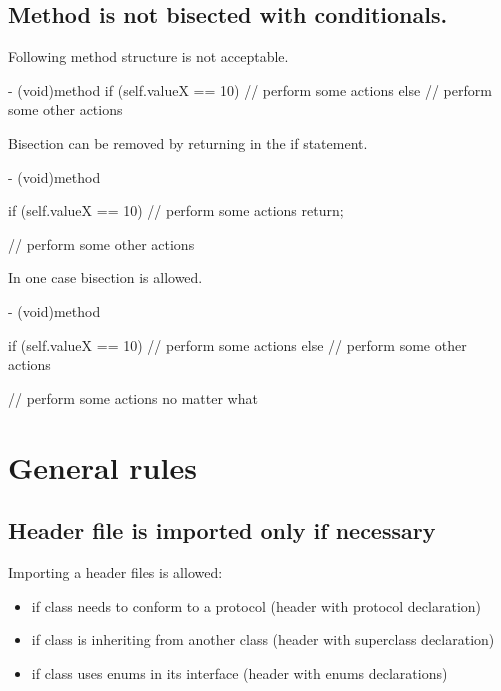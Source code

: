 \documentclass[10pt]{extarticle}
\newenvironment{codelisting}
{\footnotesize\mdframed[middlelinewidth=0.5pt, middlelinecolor=BaliHaiColor, skipabove=15pt]\verbatim}
{\endverbatim\endmdframed\vspace{12pt}\normalsize}
\begin{document}
\subsection{Method is not bisected with conditionals.}

Following method structure is not acceptable.

\begin{codelisting}
- (void)method
{
    if (self.valueX == 10) {
        // perform some actions
    }
    else {
        // perform some other actions
    }
}
\end{codelisting}

Bisection can be removed by returning in the if statement.

\begin{codelisting}
- (void)method
{
    if (self.valueX == 10) {
        // perform some actions
        return;
    }
    
    // perform some other actions
}
\end{codelisting}

In one case bisection is allowed.

\begin{codelisting}
- (void)method
{
    if (self.valueX == 10) {
        // perform some actions
    }
    else {
        // perform some other actions
    }
    
    // perform some actions no matter what
}
\end{codelisting}


\section{General rules}

\subsection{Header file is imported only if necessary}

Importing a header files is allowed:

\begin{itemize}
\item if class needs to conform to a protocol (header with protocol declaration)
\item if class is inheriting from another class (header with superclass declaration)
\item if class uses enums in its interface (header with enums declarations)
\end{itemize}
\end{document}
